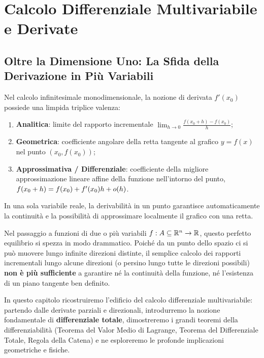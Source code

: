 
\chapter{Calcolo Differenziale Multivariabile e Derivate}
\label{chap:differenziale_e_derivate}

\section{Oltre la Dimensione Uno: La Sfida della Derivazione in Più Variabili}

Nel calcolo infinitesimale monodimensionale, la nozione di derivata $f'(x_0)$ possiede una limpida triplice valenza:
\begin{enumerate}
    \item \textbf{Analitica}: limite del rapporto incrementale $\lim_{h \to 0} \frac{f(x_0+h)-f(x_0)}{h}$;
    \item \textbf{Geometrica}: coefficiente angolare della retta tangente al grafico $y = f(x)$ nel punto $(x_0, f(x_0))$;
    \item \textbf{Approssimativa / Differenziale}: coefficiente della migliore approssimazione lineare affine della funzione nell'intorno del punto, $f(x_0+h) = f(x_0) + f'(x_0) h + o(h)$.
\end{enumerate}
In una sola variabile reale, la derivabilità in un punto garantisce automaticamente la continuità e la possibilità di approssimare localmente il grafico con una retta.

Nel passaggio a funzioni di due o più variabili $f: A \subseteq \mathbb{R}^n \to \mathbb{R}$, questo perfetto equilibrio si spezza in modo drammatico. Poiché da un punto dello spazio ci si può muovere lungo infinite direzioni distinte, il semplice calcolo dei rapporti incrementali lungo alcune direzioni (o persino lungo tutte le direzioni possibili) \textbf{non è più sufficiente} a garantire né la continuità della funzione, né l'esistenza di un piano tangente ben definito.

In questo capitolo ricostruiremo l'edificio del calcolo differenziale multivariabile: partendo dalle derivate parziali e direzionali, introdurremo la nozione fondamentale di \textbf{differenziale totale}, dimostreremo i grandi teoremi della differenziabilità (Teorema del Valor Medio di Lagrange, Teorema del Differenziale Totale, Regola della Catena) e ne esploreremo le profonde implicazioni geometriche e fisiche.

